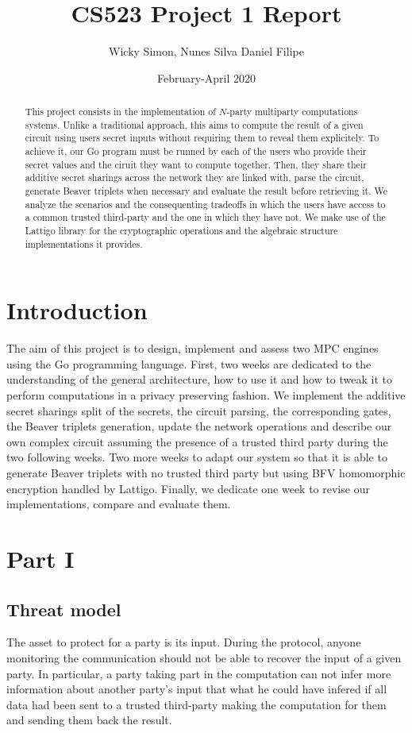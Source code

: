 \documentclass[10pt,conference]{IEEEtran}
\title{CS523 Project 1 Report}
\author{Wicky Simon, Nunes Silva Daniel Filipe}
\date{February-April 2020}
\begin{document}
\maketitle

\begin{abstract}
This project consists in the implementation of $N$-party multiparty
computations systems. Unlike a traditional approach, this aims to compute
the result of a given circuit using users secret inputs without requiring
them to reveal them explicitely. To achieve it, our Go program must be runned
by each of the users who provide their secret values and the ciruit they
want to compute together. Then, they share their additive secret sharings
across the network they are linked with, parse the circuit, generate Beaver
triplets when necessary and evaluate the result before retrieving it.
We analyze the scenarios and the consequenting tradeoffs in which the users
have access to a common trusted third-party and the one in which they have not. We
make use of the Lattigo library for the cryptographic operations and the
algebraic structure implementations it provides.
\end{abstract}

\section{Introduction}
The aim of this project is to design, implement and assess two MPC engines using
the Go programming language. First, two weeks are dedicated to the understanding
of the general architecture, how to use it and how to tweak it to perform
computations in a privacy preserving fashion. We implement the additive secret
sharings split of the secrets, the circuit parsing, the corresponding gates, the
Beaver triplets generation, update the network operations and describe our own
complex circuit assuming the presence of a trusted third party during the two
following weeks. Two more weeks to adapt our system so that it is able to
generate Beaver triplets with no trusted third party but using BFV homomorphic
encryption handled by Lattigo. Finally, we dedicate one week to revise our
implementations, compare and evaluate them.

\section{Part I}
\subsection{Threat model}
The asset to protect for a party is its input. During the protocol, anyone monitoring the communication should not be able to recover the input of a given party. In particular, a party taking part in the computation can not infer more information about another party's input that what he could have infered if all data had been sent to a trusted third-party making the computation for them and sending them back the result.
\end{document}
